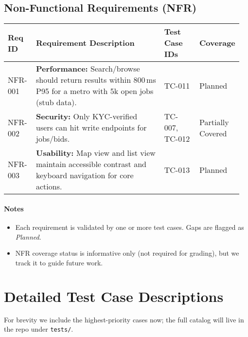 \documentclass[11pt]{article}
\begin{document}
\subsection*{Non-Functional Requirements (NFR)}
\begin{longtable}{@{}p{0.12\linewidth} p{0.55\linewidth} p{0.15\linewidth} p{0.14\linewidth}@{}}
\toprule
\textbf{Req ID} & \textbf{Requirement Description} & \textbf{Test Case IDs} & \textbf{Coverage} \\
\midrule
\endhead
NFR-001 & \textbf{Performance:} Search/browse should return results within 800\,ms P95 for a metro with 5k open jobs (stub data). & TC-011 & Planned \\
NFR-002 & \textbf{Security:} Only KYC-verified users can hit write endpoints for jobs/bids. & TC-007, TC-012 & Partially Covered \\
NFR-003 & \textbf{Usability:} Map view and list view maintain accessible contrast and keyboard navigation for core actions. & TC-013 & Planned \\
\bottomrule
\end{longtable}

\paragraph{Notes}
\begin{itemize}[leftmargin=1.4em]
  \item Each requirement is validated by one or more test cases. Gaps are flagged as \textit{Planned}.
  \item NFR coverage status is informative only (not required for grading), but we track it to guide future work.
\end{itemize}

\section{Detailed Test Case Descriptions}
For brevity we include the highest-priority cases now; the full catalog will live in the repo under \texttt{tests/}.
\end{document}
